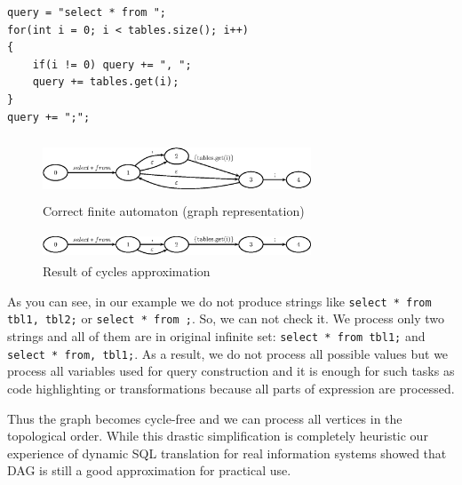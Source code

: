 \begin{verbatim} 
query = "select * from ";
for(int i = 0; i < tables.size(); i++)
{
    if(i != 0) query += ", ";
    query += tables.get(i);
}
query += ";";
\end{verbatim}

\begin{figure}[t]
    \begin{center}
        \includegraphics[width=8cm,height=1.8cm]{../../graphs/cyclesOrig.eps}
        \caption{Correct finite automaton (graph representation)}
        \label{cyclesOrig}        
    \end{center}
\end{figure}



\begin{figure}[t]
    \begin{center}
        \includegraphics[width=8cm,height=0.8cm]{../../graphs/cyclesApproximation.eps}
        \caption{Result of cycles approximation}
        \label{cyclesApproximation}        
    \end{center}
\end{figure}


As you can see, in our example we do not produce strings like \verb|select * from tbl1, tbl2;| or \verb|select * from ;|. So, we can not check it. We process only two strings and all of them are in original infinite set: \verb|select * from tbl1;| and \verb|select * from, tbl1;|. As a result, we do not process all possible values but we process all variables used for query construction and it is enough for such tasks as code highlighting or transformations because all parts of expression are processed. 

Thus the graph becomes cycle-free and we can process all vertices in the topological order. While this drastic simplification is completely heuristic our experience of dynamic SQL translation for real information systems showed that DAG is still a good approximation for practical use.


